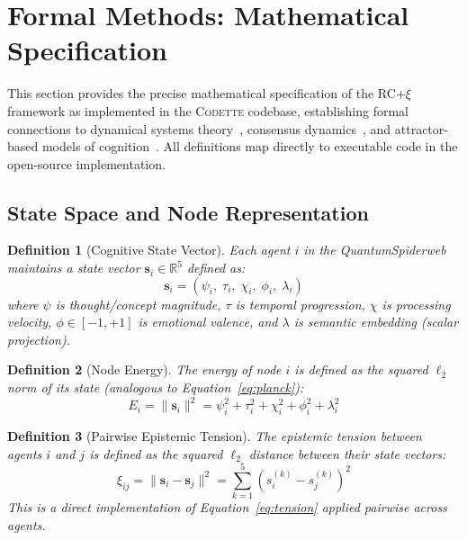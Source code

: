 \documentclass[11pt,a4paper]{article}
\newcommand{\codette}{\textsc{Codette}}
\newtheorem{definition}{Definition}[section]
\begin{document}
\section{Formal Methods: Mathematical Specification}
\label{sec:formal_methods}

This section provides the precise mathematical specification of the RC+$\xi$ framework as implemented in the \codette{} codebase, establishing formal connections to dynamical systems theory~\citep{khalil2002nonlinear,strogatz2015nonlinear}, consensus dynamics~\citep{olfatisaber2007consensus,ren2005consensus}, and attractor-based models of cognition~\citep{beer2000dynamical,kelso1995dynamic}. All definitions map directly to executable code in the open-source implementation.

\subsection{State Space and Node Representation}

\begin{definition}[Cognitive State Vector]
Each agent $i$ in the QuantumSpiderweb maintains a state vector $\mathbf{s}_i \in \mathbb{R}^5$ defined as:
\begin{equation}
  \mathbf{s}_i = (\psi_i,\; \tau_i,\; \chi_i,\; \phi_i,\; \lambda_i)
  \label{eq:state_vector}
\end{equation}
where $\psi$ is thought/concept magnitude, $\tau$ is temporal progression, $\chi$ is processing velocity, $\phi \in [-1, +1]$ is emotional valence, and $\lambda$ is semantic embedding (scalar projection).
\end{definition}

\begin{definition}[Node Energy]
The energy of node $i$ is defined as the squared $\ell_2$ norm of its state (analogous to Equation~\ref{eq:planck}):
\begin{equation}
  E_i = \|\mathbf{s}_i\|^2 = \psi_i^2 + \tau_i^2 + \chi_i^2 + \phi_i^2 + \lambda_i^2
  \label{eq:node_energy}
\end{equation}
\end{definition}

\begin{definition}[Pairwise Epistemic Tension]
The epistemic tension between agents $i$ and $j$ is defined as the squared $\ell_2$ distance between their state vectors:
\begin{equation}
  \xi_{ij} = \|\mathbf{s}_i - \mathbf{s}_j\|^2 = \sum_{k=1}^{5} (s_i^{(k)} - s_j^{(k)})^2
  \label{eq:pairwise_tension}
\end{equation}
This is a direct implementation of Equation~\ref{eq:tension} applied pairwise across agents.
\end{definition}
\end{document}
